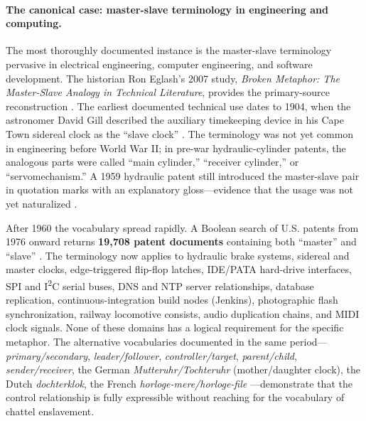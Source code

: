 \paragraph{The canonical case: master-slave terminology in engineering and computing.}
The most thoroughly documented instance is the master-slave terminology pervasive in electrical engineering, computer engineering, and software development. The historian Ron Eglash's 2007 study, \textit{Broken Metaphor: The Master-Slave Analogy in Technical Literature}, provides the primary-source reconstruction \cite{eglash_broken}. The earliest documented technical use dates to 1904, when the astronomer David Gill described the auxiliary timekeeping device in his Cape Town sidereal clock as the ``slave clock'' \cite{eglash_broken}. The terminology was not yet common in engineering before World War II; in pre-war hydraulic-cylinder patents, the analogous parts were called ``main cylinder,'' ``receiver cylinder,'' or ``servomechanism.'' A 1959 hydraulic patent still introduced the master-slave pair in quotation marks with an explanatory gloss---evidence that the usage was not yet naturalized \cite{eglash_broken}.

After 1960 the vocabulary spread rapidly. A Boolean search of U.S. patents from 1976 onward returns \textbf{19{,}708 patent documents} containing both ``master'' and ``slave'' \cite{eglash_broken}. The terminology now applies to hydraulic brake systems, sidereal and master clocks, edge-triggered flip-flop latches, IDE/PATA hard-drive interfaces, SPI and I\textsuperscript{2}C serial buses, DNS and NTP server relationships, database replication, continuous-integration build nodes (Jenkins), photographic flash synchronization, railway locomotive consists, audio duplication chains, and MIDI clock signals. None of these domains has a logical requirement for the specific metaphor. The alternative vocabularies documented in the same period---\textit{primary/secondary}, \textit{leader/follower}, \textit{controller/target}, \textit{parent/child}, \textit{sender/receiver}, the German \textit{Mutteruhr/Tochteruhr} (mother/daughter clock), the Dutch \textit{dochterklok}, the French \textit{horloge-mere/horloge-file} \cite{eglash_broken}---demonstrate that the control relationship is fully expressible without reaching for the vocabulary of chattel enslavement.


